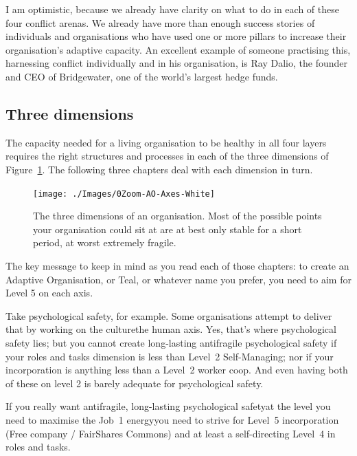 I am optimistic, because we already have clarity on what to do in each of these four conflict arenas. We already have more than enough success stories of individuals and organisations who have used one or more pillars to increase their organisation’s adaptive capacity. An excellent example of someone practising this, harnessing conflict individually and in his organisation, is Ray Dalio\cite{dalio-principles},  the founder and CEO of Bridgewater, one of the world's largest hedge funds. 


\subsection{Three dimensions}
The capacity needed for a living organisation to be healthy in all four layers requires the right structures and processes in each of the three dimensions of Figure~\ref{figure:three-axes}. The following three chapters deal with each dimension in turn.


\begin{figure}
\begin{center}
\texttt{[image: ./Images/0Zoom-AO-Axes-White]}
\end{center}
\caption[The three dimensions of an organisation]{The three dimensions of an organisation. Most of the possible points your organisation could sit at are at best only stable for a short period, at worst extremely fragile.}
\label{figure:three-axes}
\end{figure}


The key message to keep in mind as you read each of those chapters: to create an Adaptive Organisation,  or Teal,  or whatever name you prefer, you need to aim for Level 5 on each axis. 


Take psychological safety, for example. Some organisations attempt to deliver that by working on the culture\textemdash the human axis. Yes, that’s where psychological safety lies; but you cannot create long-lasting antifragile psychological safety  if your roles and tasks dimension is less than Level~2 Self-Managing; nor if your incorporation is anything less than a Level~2 worker coop. And even having both of these on level 2 is barely adequate for psychological safety. 


If you really want antifragile, long-lasting psychological safety\textemdash at the level you need to maximise the Job~1 energy\textemdash you need to strive for Level~5 incorporation (Free company / FairShares Commons) and at least a self-directing Level~4 in roles and tasks. 


